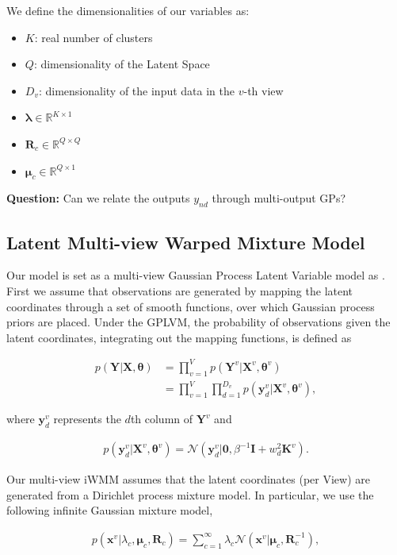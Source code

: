 \documentclass[]{article}
\newcommand{\gD}[2]{\mathcal{N}\left(#1,#2\right)}
\newcommand{\eye}{\mathbf{I}}
\newcommand{\setYv}{\mathbf{Y}^{v}}
\newcommand{\setY}{\mathbf{Y}}
\newcommand{\setXv}{\mathbf{X}^{v}}
\newcommand{\setKv}{\mathbf{K}^{v}}
\newcommand{\setX}{\mathbf{X}}
\newcommand{\hParams}{\boldsymbol{\theta}}
\newcommand{\hParamsv}{\boldsymbol{\theta}^{v}}
\newcommand{\lambdac}{\lambda_c}
\newcommand{\muC}{\boldsymbol{\mu}_c}
\newcommand{\RC}{\mathbf{R}_c}
\begin{document}
We define the dimensionalities of our variables as:

\begin{itemize}
	\item 	$K$: real number of clusters
	\item $Q$:  dimensionality of the Latent Space
	\item $D_v$: dimensionality of the input data in the $v$-th view 
	\item $\boldsymbol{\lambda} \in \mathbb{R}^{K\times 1}$ 
	\item $\mathbf{R}_c \in \mathbb{R}^{Q\times Q}$
	\item $\boldsymbol{\mu}_c \in \mathbb{R}^{Q\times 1}$
\end{itemize}


\textbf{Question:} Can we relate the outputs $y_{nd}$ through multi-output GPs?

\subsection{Latent Multi-view Warped Mixture Model}

Our model is set as a multi-view Gaussian Process Latent Variable model as \cite{Lawrence03}. First we assume 
that observations are generated by mapping the latent coordinates through a set of smooth functions, over
which Gaussian process priors are placed. Under the GPLVM, the probability of observations given the latent
coordinates, integrating out the mapping functions, is defined as

\begin{align}
p\left(\setY|\setX,\hParams\right) &= \prod_{v=1}^{V}p\left(\setYv|\setXv,\hParamsv\right) \\
   &= \prod_{v=1}^{V}\prod_{d=1}^{D_v}p\left(\mathbf{y}_d^v|\setXv,\hParamsv\right),
\end{align}


where $\mathbf{y}_d^v$ represents the $d$th column of $\setYv$ and

\begin{align}
p\left(\mathbf{y}_d^v|\setXv,\hParamsv\right) = \gD{\mathbf{y}_d^v|\mathbf{0}}{\beta^{-1}\eye + w_d^2\setKv}.
\end{align}

Our multi-view iWMM assumes that the latent coordinates (per View) are generated from a Dirichlet process mixture model. In particular, we use the following infinite Gaussian mixture model,

\begin{align}
p(\mathbf{x}^{v}|\lambdac,\muC,\RC) = \sum_{c=1}^{\infty}\lambdac \gD{\mathbf{x}^{v}|\muC}{\RC^{-1}},
\end{align}
\end{document}
